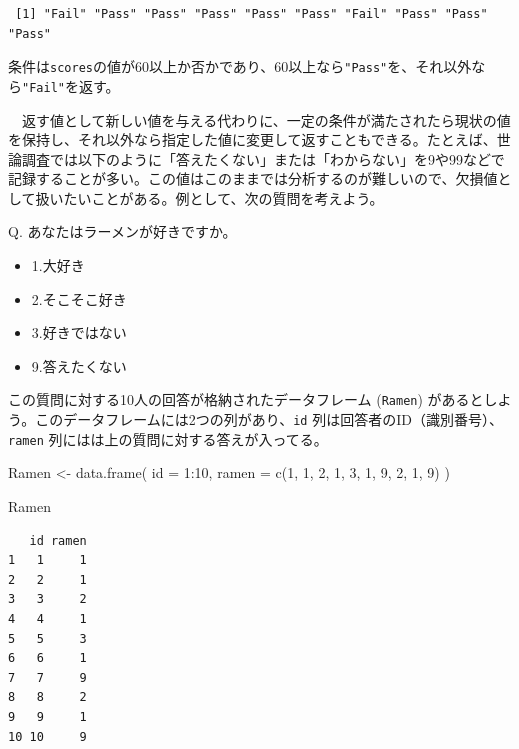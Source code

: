 \documentclass[
  a4paper,
  pandoc,
  ja=standard,
  jafont=haranoaji]{bxjsbook}
\newenvironment{Shaded}{\begin{snugshade}}{\end{snugshade}}
\newcommand{\AttributeTok}[1]{\textcolor[rgb]{0.00,0.48,0.65}{#1}}
\newcommand{\DecValTok}[1]{\textcolor[rgb]{0.68,0.00,0.00}{#1}}
\newcommand{\FunctionTok}[1]{\textcolor[rgb]{0.28,0.35,0.67}{#1}}
\newcommand{\NormalTok}[1]{\textcolor[rgb]{0.00,0.48,0.65}{#1}}
\newcommand{\OtherTok}[1]{\textcolor[rgb]{0.00,0.48,0.65}{#1}}
\newcommand{\SpecialCharTok}[1]{\textcolor[rgb]{0.37,0.37,0.37}{#1}}
\providecommand{\tightlist}{%
  \setlength{\itemsep}{0pt}\setlength{\parskip}{0pt}}
\begin{document}
\begin{verbatim}
 [1] "Fail" "Pass" "Pass" "Pass" "Pass" "Pass" "Fail" "Pass" "Pass" "Pass"
\end{verbatim}

条件は\texttt{scores}の値が60以上か否かであり、60以上なら\texttt{"Pass"}を、それ以外なら\texttt{"Fail"}を返す。

　返す値として新しい値を与える代わりに、一定の条件が満たされたら現状の値を保持し、それ以外なら指定した値に変更して返すこともできる。たとえば、世論調査では以下のように「答えたくない」または「わからない」を9や99などで記録することが多い。この値はこのままでは分析するのが難しいので、欠損値として扱いたいことがある。例として、次の質問を考えよう。

Q. あなたはラーメンが好きですか。

\begin{itemize}
\tightlist
\item
  1.大好き
\item
  2.そこそこ好き
\item
  3.好きではない
\item
  9.答えたくない
\end{itemize}

この質問に対する10人の回答が格納されたデータフレーム (\texttt{Ramen})
があるとしよう。このデータフレームには2つの列があり、\texttt{id}
列は回答者のID（識別番号）、\texttt{ramen}
列にはは上の質問に対する答えが入ってる。

\begin{Shaded}
\begin{Highlighting}[numbers=left,,]
\NormalTok{Ramen }\OtherTok{\textless{}{-}} \FunctionTok{data.frame}\NormalTok{(}
  \AttributeTok{id    =} \DecValTok{1}\SpecialCharTok{:}\DecValTok{10}\NormalTok{,}
  \AttributeTok{ramen =} \FunctionTok{c}\NormalTok{(}\DecValTok{1}\NormalTok{, }\DecValTok{1}\NormalTok{, }\DecValTok{2}\NormalTok{, }\DecValTok{1}\NormalTok{, }\DecValTok{3}\NormalTok{, }\DecValTok{1}\NormalTok{, }\DecValTok{9}\NormalTok{, }\DecValTok{2}\NormalTok{, }\DecValTok{1}\NormalTok{, }\DecValTok{9}\NormalTok{)}
\NormalTok{)}
\end{Highlighting}
\end{Shaded}

\begin{Shaded}
\begin{Highlighting}[numbers=left,,]
\NormalTok{Ramen}
\end{Highlighting}
\end{Shaded}

\begin{verbatim}
   id ramen
1   1     1
2   2     1
3   3     2
4   4     1
5   5     3
6   6     1
7   7     9
8   8     2
9   9     1
10 10     9
\end{verbatim}
\end{document}
